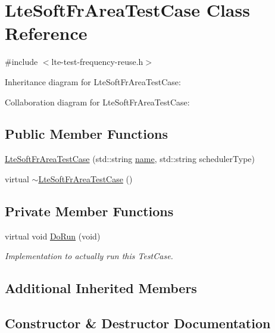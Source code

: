 \hypertarget{classLteSoftFrAreaTestCase}{}\section{Lte\+Soft\+Fr\+Area\+Test\+Case Class Reference}
\label{classLteSoftFrAreaTestCase}


{\ttfamily \#include $<$lte-\/test-\/frequency-\/reuse.\+h$>$}



Inheritance diagram for Lte\+Soft\+Fr\+Area\+Test\+Case\+:


Collaboration diagram for Lte\+Soft\+Fr\+Area\+Test\+Case\+:
\subsection*{Public Member Functions}
\begin{DoxyCompactItemize}
\item 
\hyperlink{classLteSoftFrAreaTestCase_ad01f6c0119cc8a0d090ae2ddd367de3b}{Lte\+Soft\+Fr\+Area\+Test\+Case} (std\+::string \hyperlink{generate__test__data__lte__spectrum__model_8m_ab74e6bf80237ddc4109968cedc58c151}{name}, std\+::string scheduler\+Type)
\item 
virtual \hyperlink{classLteSoftFrAreaTestCase_ab2bec4999a848a244ba61f79fc59c40b}{$\sim$\+Lte\+Soft\+Fr\+Area\+Test\+Case} ()
\end{DoxyCompactItemize}
\subsection*{Private Member Functions}
\begin{DoxyCompactItemize}
\item 
virtual void \hyperlink{classLteSoftFrAreaTestCase_ae0df301b6c0f1a80a0145746b15a109c}{Do\+Run} (void)
\begin{DoxyCompactList}\small\item\em Implementation to actually run this Test\+Case. \end{DoxyCompactList}\end{DoxyCompactItemize}
\subsection*{Additional Inherited Members}


\subsection{Constructor \& Destructor Documentation}
